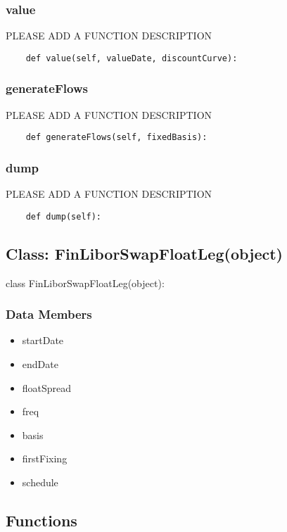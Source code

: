 \documentclass[twoside,11pt]{book}
\begin{document}
\subsubsection*{{\bf value}}
PLEASE ADD A FUNCTION DESCRIPTION

\begin{lstlisting}
    def value(self, valueDate, discountCurve):
\end{lstlisting}

\subsubsection*{{\bf generateFlows}}
PLEASE ADD A FUNCTION DESCRIPTION

\begin{lstlisting}
    def generateFlows(self, fixedBasis):
\end{lstlisting}

\subsubsection*{{\bf dump}}
PLEASE ADD A FUNCTION DESCRIPTION

\begin{lstlisting}
    def dump(self):
\end{lstlisting}

\subsection*{Class: FinLiborSwapFloatLeg(object)}
class FinLiborSwapFloatLeg(object): 

\subsubsection*{Data Members}
\begin{itemize}
\item{startDate}
\item{endDate}
\item{floatSpread}
\item{freq}
\item{basis}
\item{firstFixing}
\item{schedule}
\end{itemize}

\subsection*{Functions}
\end{document}
